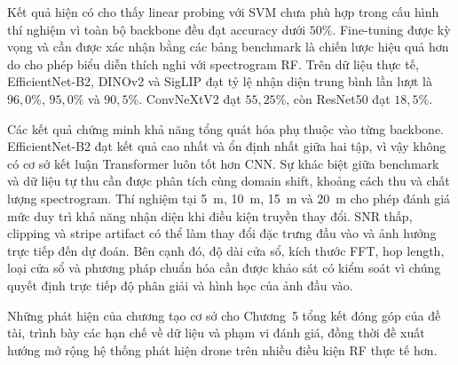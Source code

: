 \documentclass[../DoAn.tex]{subfiles}
\begin{document}
Kết quả hiện có cho thấy linear probing với SVM chưa phù hợp trong cấu hình thí nghiệm vì toàn bộ backbone đều đạt accuracy dưới $50\%$. Fine-tuning được kỳ vọng và cần được xác nhận bằng các bảng benchmark là chiến lược hiệu quả hơn do cho phép biểu diễn thích nghi với spectrogram RF. Trên dữ liệu thực tế, EfficientNet-B2, DINOv2 và SigLIP đạt tỷ lệ nhận diện trung bình lần lượt là $96,0\%$, $95,0\%$ và $90,5\%$. ConvNeXtV2 đạt $55,25\%$, còn ResNet50 đạt $18,5\%$.

Các kết quả chứng minh khả năng tổng quát hóa phụ thuộc vào từng backbone. EfficientNet-B2 đạt kết quả cao nhất và ổn định nhất giữa hai tập, vì vậy không có cơ sở kết luận Transformer luôn tốt hơn CNN. Sự khác biệt giữa benchmark và dữ liệu tự thu cần được phân tích cùng domain shift, khoảng cách thu và chất lượng spectrogram. Thí nghiệm tại 5~m, 10~m, 15~m và 20~m cho phép đánh giá mức duy trì khả năng nhận diện khi điều kiện truyền thay đổi. SNR thấp, clipping và stripe artifact có thể làm thay đổi đặc trưng đầu vào và ảnh hưởng trực tiếp đến dự đoán. Bên cạnh đó, độ dài cửa sổ, kích thước FFT, hop length, loại cửa sổ và phương pháp chuẩn hóa cần được khảo sát có kiểm soát vì chúng quyết định trực tiếp độ phân giải và hình học của ảnh đầu vào.

Những phát hiện của chương tạo cơ sở cho Chương~5 tổng kết đóng góp của đề tài, trình bày các hạn chế về dữ liệu và phạm vi đánh giá, đồng thời đề xuất hướng mở rộng hệ thống phát hiện drone trên nhiều điều kiện RF thực tế hơn.
\end{document}
